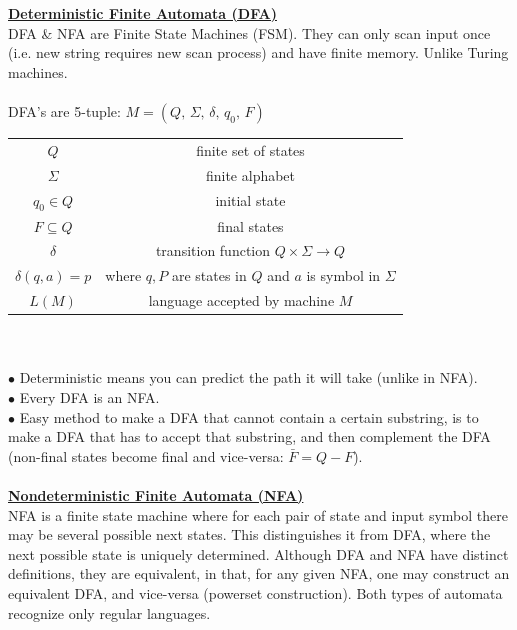 \documentclass[8pt,letterpaper,twocolumn]{article}
\begin{document}
\\
\\
\underline{\textbf{Deterministic Finite Automata (DFA)}}\\
DFA \& NFA are Finite State Machines (FSM).
They can only scan input once (i.e. new string requires new scan process) and have finite memory.
Unlike Turing machines.\\
\\
DFA's are 5-tuple: $M = (Q,\, \Sigma,\, \delta,\, q_0,\, F)$
\begin{tabular}{c c} 
$Q$ & finite set of states \\  
$\Sigma$ & finite alphabet \\
$q_0 \in Q$ & initial state \\
$F \subseteq Q$ & final states \\
$\delta$ & transition function $Q \times \Sigma \rightarrow Q$ \\
$\delta(q,a) = p$ &  where $q, P$ are states in $Q$ and $a$ is symbol in $\Sigma$\\
$L(M)$ & language accepted by machine $M$
\end{tabular}\\
\\
$\bullet$ Deterministic means you can predict the path it will take (unlike in NFA).\\
$\bullet$ Every DFA is an NFA.\\
$\bullet$ Easy method to make a DFA that cannot contain a certain substring,
is to make a DFA that has to accept that substring, and then complement the DFA
(non-final states become final and vice-versa: $\bar{F} = Q-F$).\\
\\
\underline{\textbf{Nondeterministic Finite Automata (NFA)}}\\
NFA is a finite state machine where for each pair of state and input symbol there may be several
possible next states. This distinguishes it from DFA, where the next possible state is uniquely
determined. Although DFA and NFA have distinct definitions, they are equivalent, in that,
for any given NFA, one may construct an equivalent DFA, and vice-versa (powerset construction).
Both types of automata recognize only regular languages.\\
\end{document}
